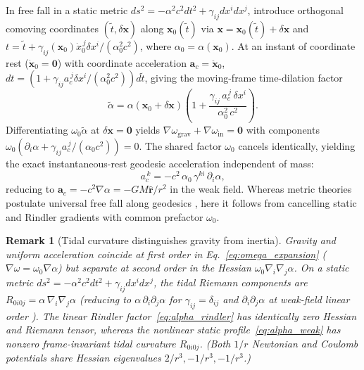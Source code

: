 \documentclass[aps,prd,onecolumn,tightenlines,nofootinbib,notitlepage,10pt,floatfix]{revtex4-2}
\theoremstyle{indentedtheorem}
\newtheorem{remark}{Remark}
\begin{document}
In free fall in a static metric $ds^2=-\alpha^2 c^2 dt^2+\gamma_{ij}dx^i dx^j$, introduce orthogonal comoving coordinates $(\tilde{t},\delta\mathbf{x})$ along $\mathbf{x}_0(\tilde{t})$ via $\mathbf{x}=\mathbf{x}_0(\tilde{t})+\delta\mathbf{x}$ and $t=\tilde{t}+\gamma_{ij}(\mathbf{x}_0)\dot{x}_0^{\,j}\delta x^i/(\alpha_0^2 c^2)$, where $\alpha_0=\alpha(\mathbf{x}_0)$. At an instant of coordinate rest ($\dot{\mathbf{x}}_0=\mathbf{0}$) with coordinate acceleration $\mathbf{a}_c=\ddot{\mathbf{x}}_0$, $dt=(1+\gamma_{ij}a_c^{\,j}\delta x^i/(\alpha_0^2 c^2))d\tilde{t}$, giving the moving-frame time-dilation factor
\begin{equation}
    \tilde{\alpha} = \alpha(\mathbf{x}_0+\delta\mathbf{x})\!\left(1+\frac{\gamma_{ij}\,a_c^{\,j}\,\delta x^i}{\alpha_0^2\,c^2}\right) .
    \label{eq:moving_frame_alpha}
\end{equation}
Differentiating $\omega_0\tilde{\alpha}$ at $\delta\mathbf{x}=\mathbf{0}$ yields $\nabla\omega_\text{grav}+\nabla\omega_\text{in}=\mathbf{0}$ with components $\omega_0(\partial_i\alpha+\gamma_{ij}a_c^{\,j}/(\alpha_0 c^2))=0$. The shared factor $\omega_0$ cancels identically, yielding the exact instantaneous-rest geodesic acceleration \citep{MTW1973Gravitation} independent of mass:
\begin{equation}
    a_c^{\,k} = -c^2\,\alpha_0\,\gamma^{ki}\,\partial_i\alpha ,
    \label{eq:freefall_accel}
\end{equation}
reducing to $\mathbf{a}_c=-c^2\nabla\alpha=-GM\hat{\mathbf{r}}/r^2$ in the weak field. Whereas metric theories postulate universal free fall along geodesics \citep{Will2014Confrontation}, here it follows from cancelling static and Rindler gradients with common prefactor $\omega_0$.

\begin{remark}[Tidal curvature distinguishes gravity from inertia]\label{rem:rank}
Gravity and uniform acceleration coincide at first order in Eq.~\eqref{eq:omega_expansion} ($\nabla\omega=\omega_0\nabla\alpha$) but separate at second order in the Hessian $\omega_0\nabla_i\nabla_j\alpha$. On a static metric $ds^2=-\alpha^2 c^2 dt^2+\gamma_{ij}dx^i dx^j$, the tidal Riemann components are $R_{0i0j}=\alpha\,\nabla_i\nabla_j\alpha$ (reducing to $\alpha\,\partial_i\partial_j\alpha$ for $\gamma_{ij}=\delta_{ij}$ and $\partial_i\partial_j\alpha$ at weak-field linear order \citep{MTW1973Gravitation}). The linear Rindler factor~\eqref{eq:alpha_rindler} has identically zero Hessian and Riemann tensor, whereas the nonlinear static profile~\eqref{eq:alpha_weak} has nonzero frame-invariant tidal curvature $R_{0i0j}$. (Both $1/r$ Newtonian and Coulomb potentials share Hessian eigenvalues $2/r^3,-1/r^3,-1/r^3$.)
\end{remark}
\end{document}
